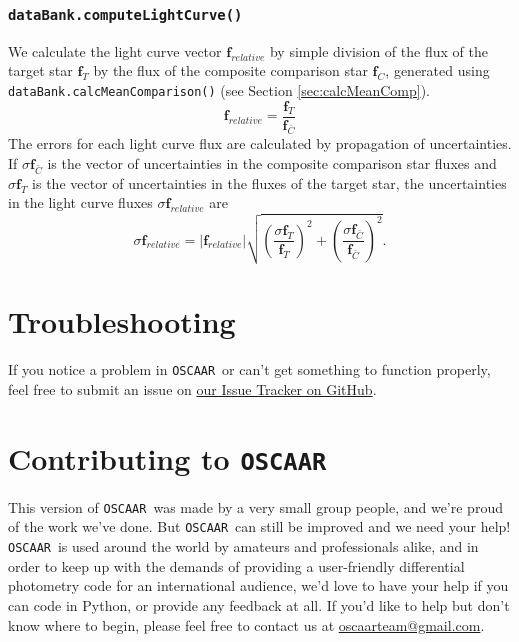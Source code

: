 \documentclass[a4paper]{article}
\newcommand{\code}[1]{\texttt{#1}}
\newcommand{\oscaar}{\code{OSCAAR}~}
\begin{document}
\subsubsection{\code{dataBank.computeLightCurve()}} \label{sec:computeLightCurve}
We calculate the light curve vector $\mathbf{f}_{relative}$ by simple division of the flux of the target star $\mathbf{f}_{T}$ by the flux of the composite comparison star $\mathbf{f}_{C}$, generated using \code{dataBank.calcMeanComparison()} (see Section \ref{sec:calcMeanComp}).
\begin{equation}
\mathbf{f}_{relative}  = \frac{\mathbf{f}_{T}}{\mathbf{f}_{\bar{C}}}
\end{equation}
The errors for each light curve flux are calculated by propagation of uncertainties. If $\sigma \mathbf{f}_{\bar{C}}$ is the vector of uncertainties in the composite comparison star fluxes and $\sigma \mathbf{f}_{T}$ is the vector of uncertainties in the fluxes of the target star, the uncertainties in the light curve fluxes $\sigma \mathbf{f}_{relative}$ are
\begin{equation}
\sigma \mathbf{f}_{relative}  = | \mathbf{f}_{relative} |  \sqrt{ \left(\frac{\sigma \mathbf{f}_{T}}{\mathbf{f}_{T}} \right)^2 + \left(\frac{\sigma \mathbf{f}_{\bar{C}}}{\mathbf{f}_{\bar{C}}} \right)^2 }.
\end{equation}

\section{Troubleshooting} \label{sec:issues}
If you notice a problem in \oscaar or can't get something to function properly, feel free to submit an issue on \href{https://github.com/OSCAAR/OSCAAR/issues?state=open}{our Issue Tracker on GitHub}. 

\section{Contributing to \oscaar}
This version of \oscaar was made by a very small group people, and we're proud of the work we've done. But \oscaar can still be improved and we need your help! \oscaar is used around the world by amateurs and professionals alike, and in order to keep up with the demands of providing a user-friendly differential photometry code for an international audience, we'd love to have your help if you can code in Python, or provide any feedback at all. If you'd like to help but don't know where to begin, please feel free to contact us at \href{mailto:oscaarteam@gmail.com}{oscaarteam@gmail.com}. 
\end{document}
